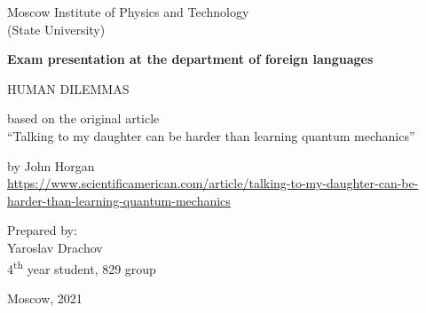 \begin{titlepage}
   \begin{center}
	   Moscow Institute of Physics and Technology\\
	   (State University)
       \vspace*{3cm}

       \textbf{Exam presentation at the
       department of foreign languages}

       \vspace{0.5cm}

       HUMAN DILEMMAS
        
       \vspace{0.5cm}
        
        based on the original article\\
	``Talking to my daughter can be harder than learning quantum mechanics''
            
       \vspace{0.5cm}

       by John Horgan\\
       \url{https://www.scientificamerican.com/article/talking-to-my-daughter-can-be-harder-than-learning-quantum-mechanics}

       \vfill
            
     
       \begin{flushright}
       Prepared by:\\
       Yaroslav Drachov\\
       4\textsuperscript{th} year student, 829 group
       \end{flushright} 
       
       \vspace{3cm}
        
       Moscow, 2021
   \end{center}
\end{titlepage}
